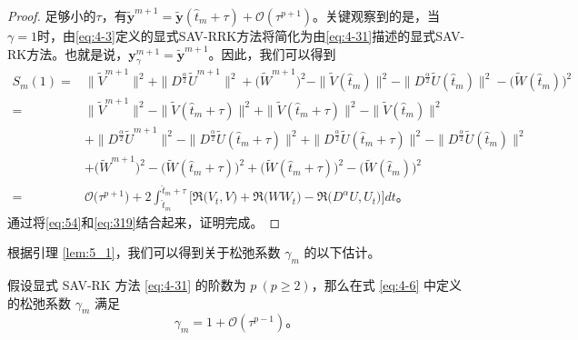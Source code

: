 \begin{proof}
足够小的$\tau$，有$\tilde{\bm{y}}^{m+1}=\tilde{\bm{y}}\left(\hat{t}_m+\tau\right)+\mathcal{O}\left(\tau^{p+1}\right)$。关键观察到的是，当$\gamma=1$时，由\eqref{eq:4-3}定义的显式SAV-RRK方法将简化为由\eqref{eq:4-31}描述的显式SAV-RK方法。也就是说，$\bm{y}_\gamma^{m +1}=\tilde{\bm{y}}^{m +1}$。因此，我们可以得到
\begin{align}
S_m(1) = &\|\tilde{V}^{m+1}\|^2 + \|D^\frac{\alpha}{2} \tilde{U}^{m+1}\|^2+\big(\tilde{W}^{m+1}\big)^2-\|\tilde{V}(\hat{t}_{m})\|^2 - \|D^\frac{\alpha}{2} \tilde{U}(\hat{t}_{m})\|^2-\big(\tilde{W}(\hat{t}_{m})\big)^2 \nonumber\\
= &\|\tilde{V}^{m+1}\|^2 -\|\tilde{V}(\hat{t}_{m}+\tau)\|^2 +\|\tilde{V}(\hat{t}_{m}+\tau)\|^2-\|\tilde{V}(\hat{t}_{m})\|^2\nonumber\\
& + \|D^\frac{\alpha}{2} \tilde{U}^{m+1}\|^2 -\|D^\frac{\alpha}{2} \tilde{U}(\hat{t}_{m}+\tau)\|^2+\|D^\frac{\alpha}{2} \tilde{U}(\hat{t}_{m}+\tau)\|^2- \|D^\frac{\alpha}{2} \tilde{U}(\hat{t}_{m})\|^2\nonumber\\
& +\big(\tilde{W}^{m+1}\big)^2 -\big(\tilde{W}(\hat{t}_{m}+\tau)\big)^2+\big(\tilde{W}(\hat{t}_{m}+\tau)\big)^2-\big(\tilde{W}(\hat{t}_{m})\big)^2 \nonumber\\
= &\mathcal{O}\big(\tau^{p+1}\big) +2\int_{\hat{t}_m}^{\hat{t}_m+\tau}\big[\Re\big(V_t, V\big) + \Re\big(W W_t\big) - \Re\big(D^{\alpha} U, U_t\big)\big]dt。\label{eq:54}
\end{align}
通过将\eqref{eq:54}和\eqref{eq:319}结合起来，证明完成。
\end{proof}

根据引理 \ref{lem:5_1}，我们可以得到关于松弛系数 $\gamma_m$ 的以下估计。

\begin{theorem}\label{thm:5_1}
	假设显式 SAV-RK 方法 \eqref{eq:4-31} 的阶数为 $p~(p \geq 2)$，那么在式 \eqref{eq:4-6} 中定义的松弛系数 $\gamma_m$ 满足
	\begin{equation}\label{eq:5_3}
	\gamma_m=1+\mathcal{O}(\tau^{p-1})。
	\end{equation}
\end{theorem}	
	
